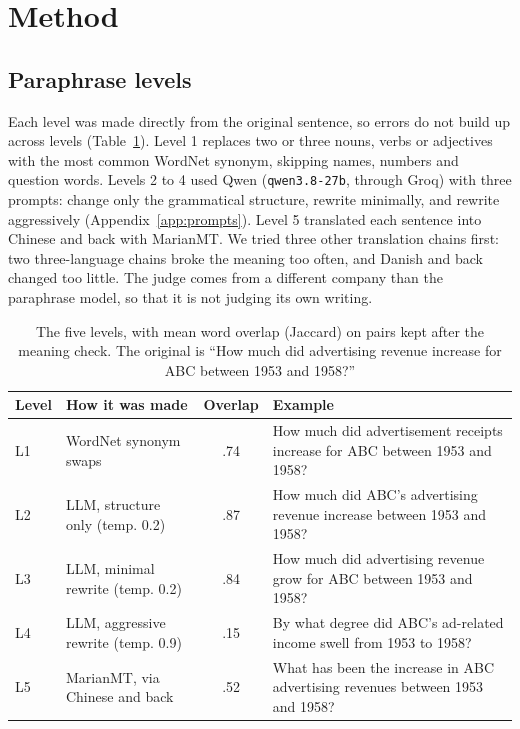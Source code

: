 \documentclass[11pt]{article}
\begin{document}
\section{Method}
\subsection{Paraphrase levels}
Each level was made directly from the original sentence, so errors do not build up across levels (Table~\ref{tab:levels}). Level 1 replaces two or three nouns, verbs or adjectives with the most common WordNet synonym, skipping names, numbers and question words. Levels 2 to 4 used Qwen (\texttt{qwen3.8-27b}, through Groq) with three prompts: change only the grammatical structure, rewrite minimally, and rewrite aggressively (Appendix~\ref{app:prompts}). Level 5 translated each sentence into Chinese and back with MarianMT. We tried three other translation chains first: two three-language chains broke the meaning too often, and Danish and back changed too little. The judge comes from a different company than the paraphrase model, so that it is not judging its own writing.

\begin{table}[t]
\centering\small
\setlength{\tabcolsep}{3pt}
\begin{tabular}{@{}llcp{8.1cm}@{}}
\toprule
\textbf{Level} & \textbf{How it was made} & \textbf{Overlap} & \textbf{Example} \\
\midrule
L1 & WordNet synonym swaps & .74 & How much did advertisement receipts increase for ABC between 1953 and 1958? \\
L2 & LLM, structure only (temp. 0.2) & .87 & How much did ABC's advertising revenue increase between 1953 and 1958? \\
L3 & LLM, minimal rewrite (temp. 0.2) & .84 & How much did advertising revenue grow for ABC between 1953 and 1958? \\
L4 & LLM, aggressive rewrite (temp. 0.9) & .15 & By what degree did ABC's ad-related income swell from 1953 to 1958? \\
L5 & MarianMT, via Chinese and back & .52 & What has been the increase in ABC advertising revenues between 1953 and 1958? \\
\bottomrule
\end{tabular}
\caption{The five levels, with mean word overlap (Jaccard) on pairs kept after the meaning check. The original is “How much did advertising revenue increase for ABC between 1953 and 1958?”}
\label{tab:levels}
\end{table}
\end{document}
